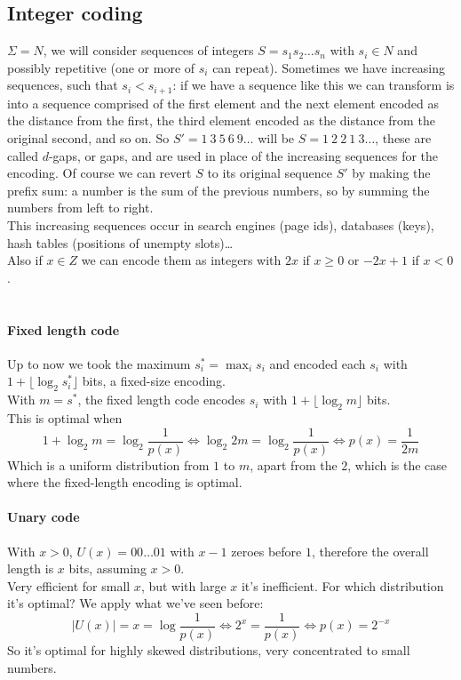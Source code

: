 \documentclass[10pt]{report}
\begin{document}
\subsection{Integer coding}
$\Sigma = N$, we will consider sequences of integers $S = s_1s_2\ldots s_n$ with $s_i\in N$ and possibly repetitive (one or more of $s_i$ can repeat). Sometimes we have increasing sequences, such that $s_i < s_{i+1}$: if we have a sequence like this we can transform is into a sequence comprised of the first element and the next element encoded as the distance from the first, the third element encoded as the distance from the original second, and so on. So $S' = 1\:3\:5\:6\:9\ldots$ will be $S = 1\:2\:2\:1\:3\ldots$, these are called $d$-gaps, or gaps, and are used in place of the increasing sequences for the encoding. Of course we can revert $S$ to its original sequence $S'$ by making the prefix sum: a number is the sum of the previous numbers, so by summing the numbers from left to right.\\
This increasing sequences occur in search engines (page ids), databases (keys), hash tables (positions of unempty slots)\ldots\\
Also if $x\in Z$ we can encode them as integers with $2x$ if $x \geq 0$ or $-2x + 1$ if $x < 0$.\\\\
\paragraph{Fixed length code} Up to now we took the maximum $s_i^* = \max_i s_i$ and encoded each $s_i$ with $1+ \lfloor \log_2 s_i^*\rfloor$ bits, a fixed-size encoding.\\
With $m = s^*$, the fixed length code encodes $s_i$ with $1+ \lfloor \log_2 m\rfloor$ bits.\\
This is optimal when $$1+ \log_2 m = \log_2 \frac{1}{p(x)}\Leftrightarrow \log_2 2m = \log_2 \frac{1}{p(x)} \Leftrightarrow p(x) = \frac{1}{2m}$$
Which is a uniform distribution from $1$ to $m$, apart from the $2$, which is the case where the fixed-length encoding is optimal.
\paragraph{Unary code} With $x>0$, $U(x)=00\ldots01$ with $x-1$ zeroes before $1$, therefore the overall length is $x$ bits, assuming $x > 0$.\\
Very efficient for small $x$, but with large $x$ it's inefficient. For which distribution it's optimal? We apply what we've seen before: $$|U(x)| = x = \log \frac{1}{p(x)} \Leftrightarrow  2^x = \frac{1}{p(x)} \Leftrightarrow p(x) = 2^{-x}$$ So it's optimal for highly skewed distributions, very concentrated to small numbers.
\end{document}
